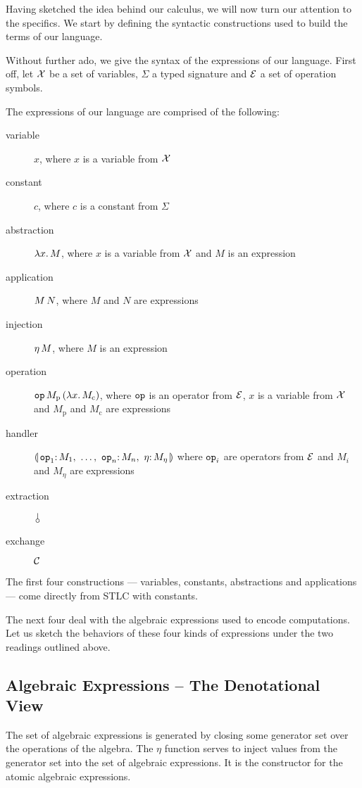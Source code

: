 Having sketched the idea behind our calculus, we will now turn our
attention to the specifics. We start by defining the syntactic
constructions used to build the terms of our language.

Without further ado, we give the syntax of the expressions of our
language. First off, let $\mathcal{X}$ be a set of variables, $\Sigma$ a typed
signature and $\mathcal{E}$ a set of operation symbols.

The expressions of our language are comprised of the following:
\begin{description}
  \item[variable] $x$, where $x$ is a variable from $\mathcal{X}$
  \item[constant] $c$, where $c$ is a constant from $\Sigma$
  \item[abstraction] $\lambda x.\, M$, where $x$ is a variable from $\mathcal{X}$ and
    $M$ is an expression
  \item[application] $M\,N$, where $M$ and $N$ are expressions
  \item[injection] $\eta\,M$, where $M$ is an expression
  \item[operation]
    $\mathtt{op}\,M_{\mathrm{p}}\,(\lambda x.\, M_{\mathrm{c}})$, where
    $\mathtt{op}$ is an operator from $\mathcal{E}$, $x$ is a variable from $\mathcal{X}$ and
    $M_{\mathrm{p}}$ and $M_{\mathrm{c}}$ are expressions
  \item[handler] $\cdbanana$
    where $\mathtt{op}_i$ are operators from $\mathcal{E}$ and $M_i$ and $M_\eta$ are
    expressions
  \item[extraction] $\cherry$
  \item[exchange] $\mathcal{C}$
\end{description}

The first four constructions --- variables, constants, abstractions and
applications --- come directly from STLC with constants.

The next four deal with the algebraic expressions used to encode
computations. Let us sketch the behaviors of these four kinds of
expressions under the two readings outlined above.


\subsection*{Algebraic Expressions -- The Denotational View}

The set of algebraic expressions is generated by closing some generator set
over the operations of the algebra. The $\eta$ function serves to inject
values from the generator set into the set of algebraic expressions. It is
the constructor for the atomic algebraic expressions.

